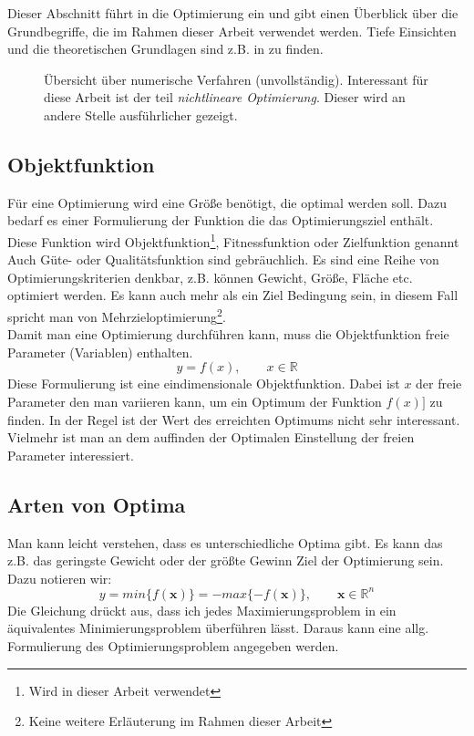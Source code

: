 %
Dieser Abschnitt führt in die Optimierung ein und gibt einen Überblick über die Grundbegriffe, die im Rahmen dieser Arbeit verwendet werden. Tiefe Einsichten und die theoretischen Grundlagen sind z.B. in \cite{Bomze1,Spellucci1} zu finden.
%
\begin{figure}[ht!]
	\centering
	\caption[Übersicht numerische Verfahren]{ Übersicht über numerische Verfahren (unvollständig). Interessant für diese Arbeit ist der teil \textit{nichtlineare Optimierung}. Dieser wird an andere Stelle ausführlicher gezeigt. }
	\label{fig:overview_numericals}
	\vspace{2mm}
	
\end{figure}
%
\subsection[Objektfunktion]{Objektfunktion}
%
Für eine Optimierung wird eine Größe benötigt, die optimal werden soll. Dazu bedarf es einer Formulierung der Funktion die das Optimierungsziel enthält. Diese Funktion wird Objektfunktion\footnote{Wird in dieser Arbeit verwendet}, Fitnessfunktion oder Zielfunktion genannt Auch Güte- oder Qualitätsfunktion sind gebräuchlich. Es sind eine Reihe von Optimierungskriterien denkbar, z.B. können Gewicht, Größe, Fläche etc. optimiert werden. Es kann auch mehr als ein Ziel Bedingung sein, in diesem Fall spricht man von Mehrzieloptimierung\footnote{Keine weitere Erläuterung im Rahmen dieser Arbeit}.\\
Damit man eine Optimierung durchführen kann, muss die Objektfunktion freie Parameter (Variablen) enthalten. 
$$
y=f(x),\qquad x\in\mathbb{R}
$$
Diese Formulierung ist eine eindimensionale Objektfunktion. Dabei ist $x$ der freie Parameter den man variieren kann, um ein Optimum der Funktion $f(x)]$ zu finden.  In der Regel ist der Wert des erreichten Optimums nicht sehr interessant. Vielmehr ist man an dem auffinden der Optimalen Einstellung der freien Parameter interessiert.
%
\subsection[Arten von Optima]{Arten von Optima}
%
Man kann leicht verstehen, dass es unterschiedliche Optima gibt. Es kann das z.B. das geringste Gewicht oder der größte Gewinn Ziel der Optimierung sein. Dazu notieren wir:
$$
y=min\{f(\mathbf{x})\} = -max\{-f(\mathbf{x})\},\qquad \mathbf{x}\in\mathbb{R}^n
$$
Die Gleichung drückt aus, dass ich jedes Maximierungsproblem in ein äquivalentes Minimierungsproblem überführen lässt. Daraus kann eine allg. Formulierung des Optimierungsproblem angegeben werden.
